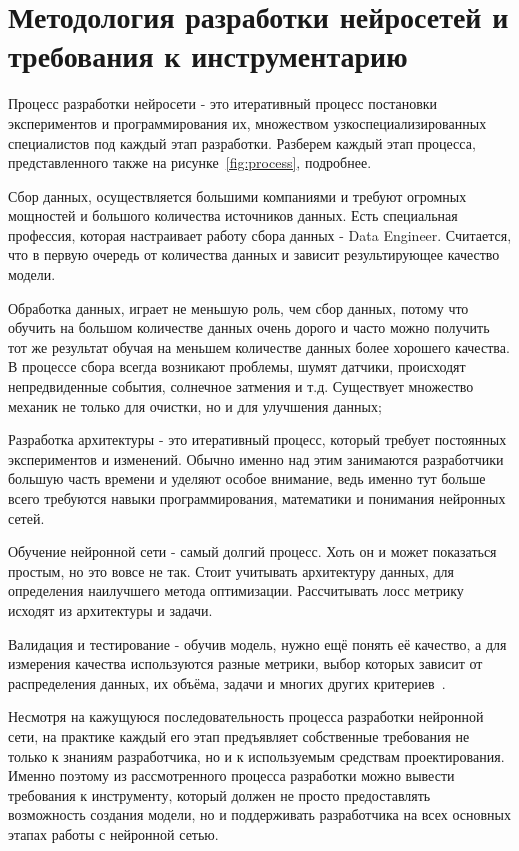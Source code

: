\documentclass{report}
\begin{document}
\section{Методология разработки нейросетей и требования к инструментарию}

Процесс разработки нейросети - это итеративный процесс постановки экспериментов и программирования их, множеством узкоспециализированных специалистов под каждый этап разработки. Разберем каждый этап процесса, представленного также на рисунке~\ref{fig:process}, подробнее.

\begin{enumarabic}
\item Сбор данных, осуществляется большими компаниями и требуют огромных мощностей и большого количества источников данных. Есть специальная профессия, которая настраивает работу сбора данных - Data Engineer. Считается, что в первую очередь от количества данных и зависит результирующее качество модели.
\item Обработка данных, играет не меньшую роль, чем сбор данных, потому что обучить на большом количестве данных очень дорого и часто можно получить тот же результат обучая на меньшем количестве данных более хорошего качества. В процессе сбора всегда возникают проблемы, шумят датчики, происходят непредвиденные события, солнечное затмения и т.д. Существует множество механик не только для очистки, но и для улучшения данных;
\item Разработка архитектуры - это итеративный процесс, который требует постоянных экспериментов и изменений. Обычно именно над этим занимаются разработчики большую часть времени и уделяют особое внимание, ведь именно тут больше всего требуются навыки программирования, математики и понимания нейронных сетей.
\item Обучение нейронной сети - самый долгий процесс. Хоть он и может показаться простым, но это вовсе не так. Стоит учитывать архитектуру данных, для определения наилучшего метода оптимизации. Рассчитывать лосс метрику исходят из архитектуры и задачи.
\item Валидация и тестирование - обучив модель, нужно ещё понять её качество, а для измерения качества используются разные метрики, выбор которых зависит от распределения данных, их объёма, задачи и многих других критериев~\cite{bib_goodfellow}.
\end{enumarabic}


Несмотря на кажущуюся последовательность процесса разработки нейронной сети, на практике каждый его этап предъявляет собственные требования не только к знаниям разработчика, но и к используемым средствам проектирования. Именно поэтому из рассмотренного процесса разработки можно вывести требования к инструменту, который должен не просто предоставлять возможность создания модели, но и поддерживать разработчика на всех основных этапах работы с нейронной сетью.
\end{document}
